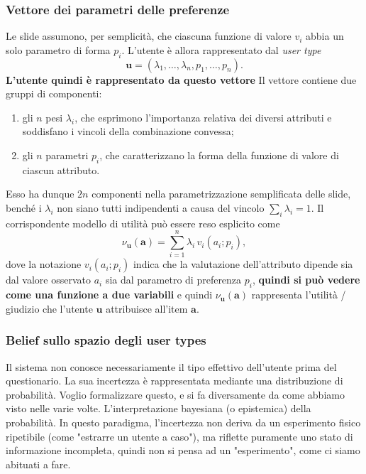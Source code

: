 \subsubsection{Vettore dei parametri delle preferenze}
Le slide assumono, per semplicità, che ciascuna funzione di valore $v_i$ abbia un solo parametro di forma $p_i$. L'utente è allora rappresentato dal \emph{user type}
\[
\boxed{\mathbf u=(\lambda_1,\ldots,\lambda_n,p_1,\ldots,p_n).}
\]
\textbf{L'utente quindi è rappresentato da questo vettore}
Il vettore contiene due gruppi di componenti:
\begin{enumerate}
    \item gli $n$ pesi $\lambda_i$, che esprimono l'importanza relativa dei diversi attributi e soddisfano i vincoli della combinazione convessa;
    \item gli $n$ parametri $p_i$, che caratterizzano la forma della funzione di valore di ciascun attributo.
\end{enumerate}
Esso ha dunque $2n$ componenti nella parametrizzazione semplificata delle slide, benché i $\lambda_i$ non siano tutti indipendenti a causa del vincolo $\sum_i\lambda_i=1$. Il corrispondente modello di utilità può essere reso esplicito come
\[
\nu_{\mathbf u}(\mathbf a)=
\sum_{i=1}^{n}\lambda_i\,v_i(a_i;p_i),
\]
dove la notazione $v_i(a_i;p_i)$ indica che la valutazione dell'attributo dipende sia dal valore osservato $a_i$ sia dal parametro di preferenza $p_i$, \textbf{quindi si può vedere come una funzione a due variabili}
e quindi $\nu_{\mathbf u}(\mathbf a)$ rappresenta l'utilità / giudizio che l'utente \(\mathbf{u}\) attribuisce all'item \(\mathbf{a}\).
\subsubsection{Belief sullo spazio degli user types}
Il sistema non conosce necessariamente il tipo effettivo dell'utente prima del questionario. La sua incertezza è rappresentata mediante una distribuzione di probabilità.
Voglio formalizzare questo, e si fa diversamente da come abbiamo visto nelle varie volte.
L'interpretazione bayesiana (o epistemica) della probabilità. In questo paradigma, l'incertezza non deriva da un esperimento fisico ripetibile (come "estrarre un utente a caso"), ma riflette puramente uno stato di informazione incompleta, quindi 
non si pensa ad un "esperimento", come ci siamo abituati a fare.


